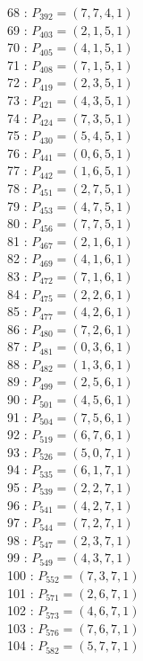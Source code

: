\documentclass{article}
\begin{document}
{\begin{multicols}{3}
68 : $P_{392}=( 7, 7, 4, 1 )$\\
69 : $P_{403}=( 2, 1, 5, 1 )$\\
70 : $P_{405}=( 4, 1, 5, 1 )$\\
71 : $P_{408}=( 7, 1, 5, 1 )$\\
72 : $P_{419}=( 2, 3, 5, 1 )$\\
73 : $P_{421}=( 4, 3, 5, 1 )$\\
74 : $P_{424}=( 7, 3, 5, 1 )$\\
75 : $P_{430}=( 5, 4, 5, 1 )$\\
76 : $P_{441}=( 0, 6, 5, 1 )$\\
77 : $P_{442}=( 1, 6, 5, 1 )$\\
78 : $P_{451}=( 2, 7, 5, 1 )$\\
79 : $P_{453}=( 4, 7, 5, 1 )$\\
80 : $P_{456}=( 7, 7, 5, 1 )$\\
81 : $P_{467}=( 2, 1, 6, 1 )$\\
82 : $P_{469}=( 4, 1, 6, 1 )$\\
83 : $P_{472}=( 7, 1, 6, 1 )$\\
84 : $P_{475}=( 2, 2, 6, 1 )$\\
85 : $P_{477}=( 4, 2, 6, 1 )$\\
86 : $P_{480}=( 7, 2, 6, 1 )$\\
87 : $P_{481}=( 0, 3, 6, 1 )$\\
88 : $P_{482}=( 1, 3, 6, 1 )$\\
89 : $P_{499}=( 2, 5, 6, 1 )$\\
90 : $P_{501}=( 4, 5, 6, 1 )$\\
91 : $P_{504}=( 7, 5, 6, 1 )$\\
92 : $P_{519}=( 6, 7, 6, 1 )$\\
93 : $P_{526}=( 5, 0, 7, 1 )$\\
94 : $P_{535}=( 6, 1, 7, 1 )$\\
95 : $P_{539}=( 2, 2, 7, 1 )$\\
96 : $P_{541}=( 4, 2, 7, 1 )$\\
97 : $P_{544}=( 7, 2, 7, 1 )$\\
98 : $P_{547}=( 2, 3, 7, 1 )$\\
99 : $P_{549}=( 4, 3, 7, 1 )$\\
100 : $P_{552}=( 7, 3, 7, 1 )$\\
101 : $P_{571}=( 2, 6, 7, 1 )$\\
102 : $P_{573}=( 4, 6, 7, 1 )$\\
103 : $P_{576}=( 7, 6, 7, 1 )$\\
104 : $P_{582}=( 5, 7, 7, 1 )$\\
\end{multicols}


}
\end{document}
